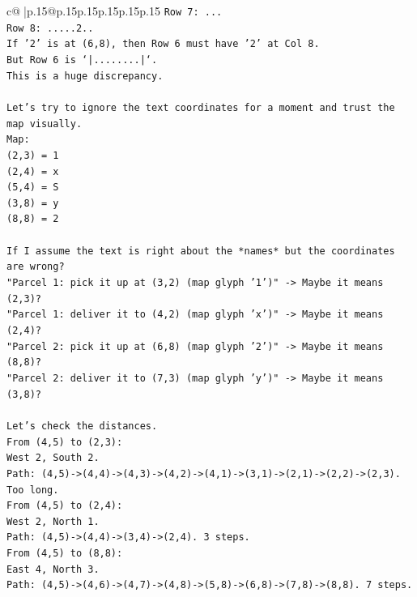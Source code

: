 \documentclass{article}
\begin{document}
{\begin{supertabular}{c@{$\;$}|p{.15\linewidth}@{}p{.15\linewidth}p{.15\linewidth}p{.15\linewidth}p{.15\linewidth}p{.15\linewidth}}
{{{\texttt{Row 7: ...} \\
\texttt{Row 8: .....2..} \\
\texttt{If '2' is at (6,8), then Row 6 must have '2' at Col 8.} \\
\texttt{But Row 6 is `|........|`.} \\
\texttt{This is a huge discrepancy.} \\
\\ 
\texttt{Let's try to ignore the text coordinates for a moment and trust the map visually.} \\
\texttt{Map:} \\
\texttt{(2,3) = 1} \\
\texttt{(2,4) = x} \\
\texttt{(5,4) = S} \\
\texttt{(3,8) = y} \\
\texttt{(8,8) = 2} \\
\\ 
\texttt{If I assume the text is right about the *names* but the coordinates are wrong?} \\
\texttt{"Parcel 1: pick it up at (3,2) (map glyph '1')" {-}> Maybe it means (2,3)?} \\
\texttt{"Parcel 1: deliver it to (4,2) (map glyph 'x')" {-}> Maybe it means (2,4)?} \\
\texttt{"Parcel 2: pick it up at (6,8) (map glyph '2')" {-}> Maybe it means (8,8)?} \\
\texttt{"Parcel 2: deliver it to (7,3) (map glyph 'y')" {-}> Maybe it means (3,8)?} \\
\\ 
\texttt{Let's check the distances.} \\
\texttt{From (4,5) to (2,3):} \\
\texttt{West 2, South 2.} \\
\texttt{Path: (4,5){-}>(4,4){-}>(4,3){-}>(4,2){-}>(4,1){-}>(3,1){-}>(2,1){-}>(2,2){-}>(2,3). Too long.} \\
\texttt{From (4,5) to (2,4):} \\
\texttt{West 2, North 1.} \\
\texttt{Path: (4,5){-}>(4,4){-}>(3,4){-}>(2,4). 3 steps.} \\
\texttt{From (4,5) to (8,8):} \\
\texttt{East 4, North 3.} \\
\texttt{Path: (4,5){-}>(4,6){-}>(4,7){-}>(4,8){-}>(5,8){-}>(6,8){-}>(7,8){-}>(8,8). 7 steps.} \\
\\ 
}}}
\end{supertabular}}
\end{document}
